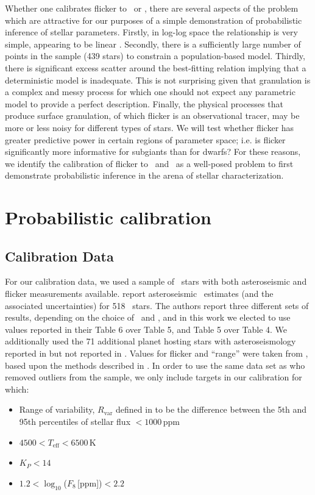 Whether one calibrates flicker to \logg\ or \rhostar, there are several aspects
of the problem which are attractive for our purposes of a simple demonstration
of probabilistic inference of stellar parameters.
Firstly, in log-log space the relationship is very simple, appearing to be
linear \citep{Kipping2014}.
Secondly, there is a sufficiently large number of points in the sample (439
stars) to constrain a population-based model.
Thirdly, there is significant excess scatter around the best-fitting relation
implying that a deterministic model is inadequate.
This is not surprising given that granulation is a complex and messy process
for which one should not expect any parametric model to provide a perfect
description.
Finally, the physical processes that produce surface granulation, of which
flicker is an observational tracer, may be more or less noisy for different
types of stars.
We will test whether flicker has greater predictive power in certain regions
of parameter space; i.e. is flicker significantly more informative for
subgiants than for dwarfs?
For these reasons, we identify the calibration of
flicker to \logg\ and \rhostar\ as a well-posed problem to first demonstrate
probabilistic inference in the arena of stellar characterization.

\section{Probabilistic calibration}
\label{sec:HBM}

\subsection{Calibration Data}

For our calibration data, we used a sample of \Kepler\ stars with
both asteroseismic and flicker measurements available. \citet{Chaplin2014}
report asteroseismic \rhostar\ estimates (and the associated uncertainties) for
518 \Kepler\ stars. The authors report three different sets of results,
depending on the choice of \Teff\ and \FeH, and in this work we elected to use
values reported in their Table 6 over Table 5, and Table 5 over Table 4. We
additionally used the 71 additional planet hosting stars with asteroseismology
reported in \citet{Huber2013} but not reported in \citet{Chaplin2014}. Values
for flicker and ``range'' were taken from \citet{Kipping2014}, based upon the
methods described in \citet{Bastien2013}.
In order to use the same data set as \citet{Kipping2014} who removed outliers
from the sample, we only include targets in our calibration for which:
\begin{itemize}
\item Range of variability, $R_{\mathrm{var}}$ defined in \citet{Bastien2013}
to be the difference between the 5th and 95th percentiles of stellar flux
$<1000$\,ppm
\item $4500<T_{\mathrm{eff}}<6500$\,K
\item $K_P<14$
\item $1.2 < \log_{10}$($F_8$\,[ppm])$< 2.2$
\end{itemize}

